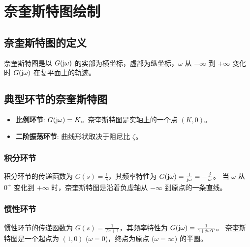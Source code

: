 \section{奈奎斯特图绘制}

\subsection{奈奎斯特图的定义}
奈奎斯特图是以 $G(\mathrm{j}\omega)$ 的实部为横坐标，虚部为纵坐标，$\omega$ 从 $-\infty$ 到 $+\infty$ 变化时 $G(\mathrm{j}\omega)$ 在复平面上的轨迹。

\subsection{典型环节的奈奎斯特图}
\begin{itemize}
    \item \textbf{比例环节}: $G(\mathrm{j}\omega) = K$。奈奎斯特图是实轴上的一个点 $(K, 0)$。
    \item \textbf{二阶振荡环节}: 曲线形状取决于阻尼比 $\zeta$。
\end{itemize}

\subsubsection{积分环节}
积分环节的传递函数为 $G(s) = \frac{1}{s}$，其频率特性为 $G(\mathrm{j}\omega) = \frac{1}{\mathrm{j}\omega} = -\frac{j}{\omega}$。
当 $\omega$ 从 $0^+$ 变化到 $+\infty$ 时，奈奎斯特图是沿着负虚轴从 $-\infty$ 到原点的一条直线。

\begin{center}
\end{center}

\subsubsection{惯性环节}
惯性环节的传递函数为 $G(s) = \frac{1}{Ts+1}$，其频率特性为 $G(\mathrm{j}\omega) = \frac{1}{1+j\omega T}$。
奈奎斯特图是一个起点为 $(1,0)$ ($\omega=0$)，终点为原点 ($\omega=\infty$) 的半圆。

